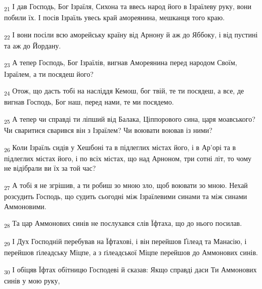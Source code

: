 \begin{tcolorbox}
\textsubscript{21} І дав Господь, Бог Ізраїля, Сихона та ввесь народ його в Ізраїлеву руку, вони побили їх. І посів Ізраїль увесь край амореянина, мешканця того краю.
\end{tcolorbox}
\begin{tcolorbox}
\textsubscript{22} І вони посіли всю аморейську країну від Арнону й аж до Яббоку, і від пустині та аж до Йордану.
\end{tcolorbox}
\begin{tcolorbox}
\textsubscript{23} А тепер Господь, Бог Ізраїлів, вигнав Амореянина перед народом Своїм, Ізраїлем, а ти посядеш його?
\end{tcolorbox}
\begin{tcolorbox}
\textsubscript{24} Отож, що дасть тобі на насліддя Кемош, бог твій, те ти посядеш, а все, де вигнав Господь, Бог наш, перед нами, те ми посядемо.
\end{tcolorbox}
\begin{tcolorbox}
\textsubscript{25} А тепер чи справді ти ліпший від Балака, Ціппорового сина, царя моавського? Чи сваритися сварився він з Ізраїлем? Чи воювати воював із ними?
\end{tcolorbox}
\begin{tcolorbox}
\textsubscript{26} Коли Ізраїль сидів у Хешбоні та в підлеглих містах його, і в Ар'орі та в підлеглих містах його, і по всіх містах, що над Арноном, три сотні літ, то чому не відібрали ви їх за той час?
\end{tcolorbox}
\begin{tcolorbox}
\textsubscript{27} А тобі я не згрішив, а ти робиш зо мною зло, щоб воювати зо мною. Нехай розсудить Господь, що судить сьогодні між Ізраїлевими синами та між синами Аммоновими.
\end{tcolorbox}
\begin{tcolorbox}
\textsubscript{28} Та цар Аммонових синів не послухався слів Їфтаха, що до нього посилав.
\end{tcolorbox}
\begin{tcolorbox}
\textsubscript{29} І Дух Господній перебував на Їфтахові, і він перейшов Ґілеад та Манасію, і перейшов ґілеадську Міцпе, а з ґілеадської Міцпе перейшов до Аммонових синів.
\end{tcolorbox}
\begin{tcolorbox}
\textsubscript{30} І обіцяв Їфтах обітницю Господеві й сказав: Якщо справді даси Ти Аммонових синів у мою руку,
\end{tcolorbox}
